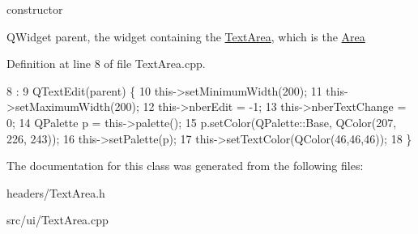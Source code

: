 constructor 

Q\+Widget parent, the widget containing the \hyperlink{classTextArea}{Text\+Area}, which is the \hyperlink{classArea}{Area} 

Definition at line 8 of file Text\+Area.\+cpp.


\begin{DoxyCode}
8                                   :
9     QTextEdit(parent) \{
10     this->setMinimumWidth(200);
11     this->setMaximumWidth(200);
12     this->nberEdit = -1;
13     this->nberTextChange = 0;
14     QPalette p = this->palette();
15     p.setColor(QPalette::Base, QColor(207, 226, 243));
16     this->setPalette(p);
17     this->setTextColor(QColor(46,46,46));
18 \}
\end{DoxyCode}


The documentation for this class was generated from the following files\+:\begin{DoxyCompactItemize}
\item 
headers/Text\+Area.\+h\item 
src/ui/Text\+Area.\+cpp\end{DoxyCompactItemize}
